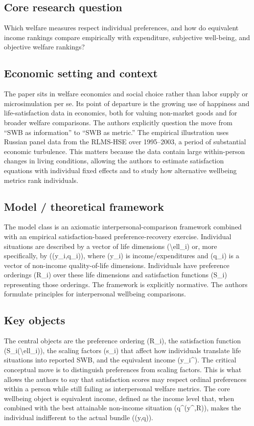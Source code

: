 \documentclass[11pt,a4paper]{article}
\begin{document}
\subsection*{Core research question}
Which welfare measures respect individual preferences, and how do equivalent income rankings compare empirically with expenditure, subjective well-being, and objective welfare rankings?

\subsection*{Economic setting and context}
The paper sits in welfare economics and social choice rather than labor supply or microsimulation per se. Its point of departure is the growing use of happiness and life-satisfaction data in economics, both for valuing non-market goods and for broader welfare comparisons. The authors explicitly question the move from “SWB as information” to “SWB as metric.” The empirical illustration uses Russian panel data from the RLMS-HSE over 1995–2003, a period of substantial economic turbulence. This matters because the data contain large within-person changes in living conditions, allowing the authors to estimate satisfaction equations with individual fixed effects and to study how alternative wellbeing metrics rank individuals.

\subsection*{Model / theoretical framework}
The model class is an axiomatic interpersonal-comparison framework combined with an empirical satisfaction-based preference-recovery exercise. Individual situations are described by a vector of life dimensions (\textbackslash{}ell\_i) or, more specifically, by ((y\_i,q\_i)), where (y\_i) is income/expenditures and (q\_i) is a vector of non-income quality-of-life dimensions. Individuals have preference orderings (R\_i) over these life dimensions and satisfaction functions (S\_i) representing those orderings. The framework is explicitly normative. The authors formulate principles for interpersonal wellbeing comparisons.

\subsection*{Key objects}
The central objects are the preference ordering (R\_i), the satisfaction function (S\_i(\textbackslash{}ell\_i)), the scaling factors (s\_i) that affect how individuals translate life situations into reported SWB, and the equivalent income (y\_i\textasciicircum{}). The critical conceptual move is to distinguish preferences from scaling factors. This is what allows the authors to say that satisfaction scores may respect ordinal preferences within a person while still failing as interpersonal welfare metrics. The core wellbeing object is equivalent income, defined as the income level that, when combined with the best attainable non-income situation (q\textasciicircum{}(y\textasciicircum{},R)), makes the individual indifferent to the actual bundle ((y,q)).
\end{document}
